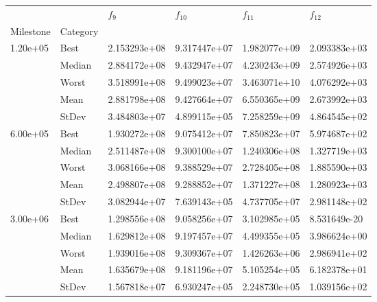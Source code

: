 \begin{tabular}{llllll}
\toprule
         &      &      $f_{9}$ &     $f_{10}$ &     $f_{11}$ &     $f_{12}$ \\
Milestone & Category &              &              &              &              \\
\midrule
\multirow{5}{*}{1.20e+05} & Best & 2.153293e+08 & 9.317447e+07 & 1.982077e+09 & 2.093383e+03 \\
         & Median & 2.884172e+08 & 9.432947e+07 & 4.230243e+09 & 2.574926e+03 \\
         & Worst & 3.518991e+08 & 9.499023e+07 & 3.463071e+10 & 4.076292e+03 \\
         & Mean & 2.881798e+08 & 9.427664e+07 & 6.550365e+09 & 2.673992e+03 \\
         & StDev & 3.484803e+07 & 4.899115e+05 & 7.258259e+09 & 4.864545e+02 \\
\cline{1-6}
\multirow{5}{*}{6.00e+05} & Best & 1.930272e+08 & 9.075412e+07 & 7.850823e+07 & 5.974687e+02 \\
         & Median & 2.511487e+08 & 9.300100e+07 & 1.240306e+08 & 1.327719e+03 \\
         & Worst & 3.068166e+08 & 9.388529e+07 & 2.728405e+08 & 1.885590e+03 \\
         & Mean & 2.498807e+08 & 9.288852e+07 & 1.371227e+08 & 1.280923e+03 \\
         & StDev & 3.082944e+07 & 7.639143e+05 & 4.737705e+07 & 2.981148e+02 \\
\cline{1-6}
\multirow{5}{*}{3.00e+06} & Best & 1.298556e+08 & 9.058256e+07 & 3.102985e+05 & 8.531649e-20 \\
         & Median & 1.629812e+08 & 9.197457e+07 & 4.499355e+05 & 3.986624e+00 \\
         & Worst & 1.939016e+08 & 9.309367e+07 & 1.426263e+06 & 2.986941e+02 \\
         & Mean & 1.635679e+08 & 9.181196e+07 & 5.105254e+05 & 6.182378e+01 \\
         & StDev & 1.567818e+07 & 6.930247e+05 & 2.248730e+05 & 1.039156e+02 \\
\bottomrule
\end{tabular}
